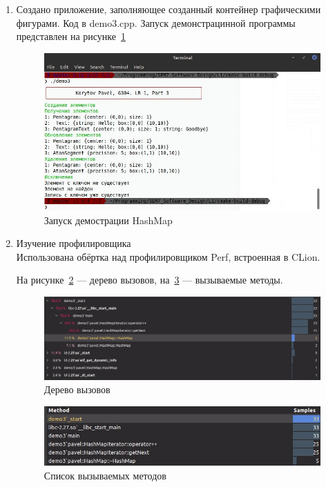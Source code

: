 \documentclass[a4paper, 14pt]{extarticle}
\begin{document}
\begin{enumerate}
    \item Создано приложение, заполняющее созданный контейнер графическими фигурами. Код в demo3.cpp. Запуск демонстрацинной программы представлен на рисунке~\ref{img:map:demo}
    \begin{figure}[h]
        \centering
        \includegraphics[width=\textwidth]{./img/S006.jpg}
        \caption{Запуск демострации HashMap}%
        \label{img:map:demo}
    \end{figure}

    \item Изучение профилировщика\\
        Использована обёртка над профилировщиком Perf, встроенная в CLion.~\cite{clion}

    На рисунке~\ref{img:map:calltree} --- дерево вызовов, на~\ref{img:map:methods} --- вызываемые методы.

    \begin{figure}[h]
        \centering
        \includegraphics[width=\textwidth]{./img/S008.jpg}
        \caption{Дерево вызовов}%
        \label{img:map:calltree}
    \end{figure}
    
    \begin{figure}[h]
        \centering
        \includegraphics[width=\textwidth]{./img/S009.jpg}
        \caption{Список вызываемых методов}%
        \label{img:map:methods}
    \end{figure}
    
\end{enumerate}
\end{document}

